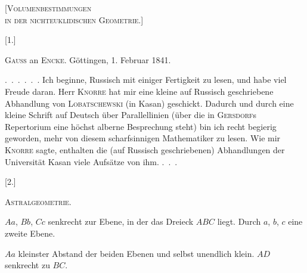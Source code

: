 \clearpage
{}%
\begin{center}
{\Large\textsc{[Volumenbestimmungen\\ in der nichteuklidischen Geometrie.]}}



[1.]

\textsc{Gauss} an \textsc{Encke}. Göttingen, 1. Februar 1841.
\end{center}


\mbox{.\ .\ .\ .\ .\ .} Ich beginne, Russisch mit einiger Fertigkeit zu lesen, und
habe viel Freude daran. Herr \textsc{Knorre} hat mir eine kleine auf Russisch
geschriebene Abhandlung von \textsc{Lobatschewski} (in Kasan) geschickt.
Dadurch und durch eine kleine Schrift auf Deutsch über Parallellinien
(über die in \textsc{Gersdorf}s Repertorium eine höchst alberne Besprechung steht) bin ich
recht begierig geworden, mehr von diesem scharfsinnigen Mathematiker zu lesen. Wie mir
\textsc{Knorre} sagte, enthalten die (auf Russisch geschriebenen)
Abhandlungen der Universität Kasan viele Aufsätze von ihm. \mbox{.\ .\ .}

\begin{center}


[2.]

\textsc{Astralgeometrie.}
\end{center}

\begin{center}\end{center}


$Aa$, $Bb$, $Cc$ senkrecht zur Ebene, in der das Dreieck $ABC$ liegt. Durch $a$, $b$, $c$
eine zweite Ebene.


$Aa$ kleinster Abstand der beiden Ebenen und selbst unendlich klein. $AD$ senkrecht
zu $BC$.
